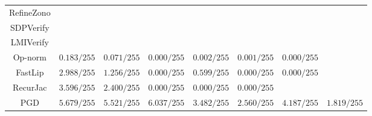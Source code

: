 \begin{table}
{\begin{tabular}{c|c|c|c|c|c|c|c}
   RefineZono &               &               &               &               &               &               &               \\
    SDPVerify &               &               &               &               &               &               &               \\
    LMIVerify &               &               &               &               &               &               &               \\
      Op-norm &   $0.183/255$ &   $0.071/255$ &   $0.000/255$ &   $0.002/255$ &   $0.001/255$ &   $0.000/255$ &               \\
      FastLip &   $2.988/255$ &   $1.256/255$ &   $0.000/255$ &   $0.599/255$ &   $0.000/255$ &   $0.000/255$ &               \\
     RecurJac &   $3.596/255$ &   $2.400/255$ &   $0.000/255$ &   $0.000/255$ &   $0.000/255$ &               &               \\
\hline
          PGD &   $5.679/255$ &   $5.521/255$ &   $6.037/255$ &   $3.482/255$ &   $2.560/255$ &   $4.187/255$ &   $1.819/255$ \\

    \bottomrule
    \end{tabular}
    }
    \label{table:exp-A-average-radius-cifar10-0}
\end{table}
    

